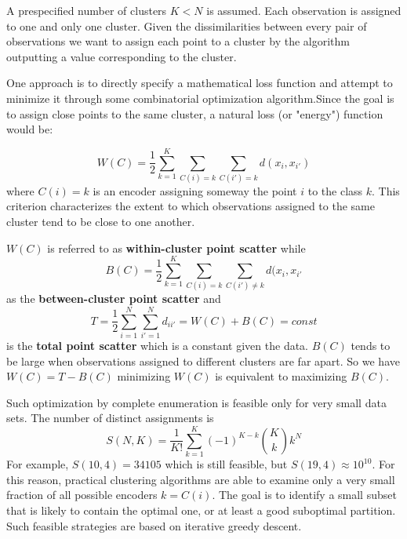 \documentclass[12pt, letterpaper]{article}
\theoremstyle{definition}
\begin{document}
A prespecified number of clusters $K<N$ is assumed.  Each observation is assigned to one and only one cluster. Given the dissimilarities between every pair of observations we want to assign each point to a cluster by the algorithm outputting a value corresponding to the cluster.

One approach is to directly specify a mathematical loss function and attempt to minimize it through some combinatorial optimization algorithm.Since the goal is to assign close points to the same cluster, a natural loss (or "energy") function would be:

\begin{equation}
W(C)  = \frac{1}{2}\sum_{k=1}^K \sum_{C(i) = k} \sum_{C(i') = k} d(x_i, x_{i'})
\end{equation}
where $C(i) = k$ is an encoder assigning someway the point $i$ to the class $k$.
This criterion characterizes the extent to which observations assigned to the same cluster tend to be close to one another.

$W(C)$ is referred to as \textbf{within-cluster point scatter} while 
\begin{equation}
B(C) =\frac{1}{2} \sum_{k=1}^K \sum_{C(i) = k} \sum_{C(i') \ne k} d(x_i, x_{i'}
\end{equation}
as the \textbf{between-cluster point scatter} and
\begin{equation}
T = \frac{1}{2} \sum_{i=1}^N \sum_{i'=1}^N d_{ii'} = W(C) + B(C) = const
\end{equation}
is the \textbf{total point scatter} which is a constant given the data. $B(C)$ tends to be large when observations assigned to different clusters are far apart.
So we have $W(C) = T - B(C) $ minimizing $W(C)$ is equivalent to maximizing $B(C)$.

Such optimization by complete enumeration is feasible only for very small data sets. The number of distinct assignments is
\begin{equation}
S(N,K) = \frac{1}{K!} \sum_{k=1}^K (-1)^{K-k} \binom{K}{k} k^N
\end{equation}
For example, $S(10, 4) = 34105$ which is still feasible, but $S(19,4) \approx 10^{10}$.  For this reason, practical clustering algorithms are able to examine only a very small fraction of all possible encoders $k = C(i)$. The goal is to identify a small subset that is likely to contain the optimal one, or at least a good suboptimal partition. Such feasible strategies are based on iterative greedy descent.
\end{document}
